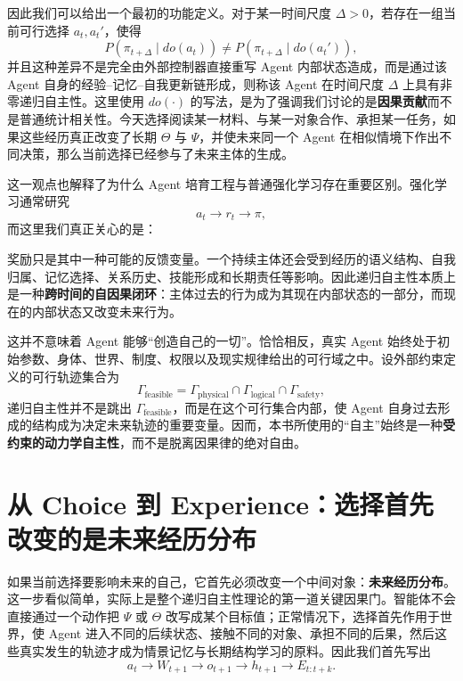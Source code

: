 因此我们可以给出一个最初的功能定义。对于某一时间尺度 $\Delta>0$，若存在一组当前可行选择 $a_t,a_t'$，使得
\[
P\!\left(
\pi_{t+\Delta}
\mid do(a_t)
\right)
\neq
P\!\left(
\pi_{t+\Delta}
\mid do(a_t')
\right),
\]
并且这种差异不是完全由外部控制器直接重写 Agent 内部状态造成，而是通过该 Agent 自身的经验--记忆--自我更新链形成，则称该 Agent 在时间尺度 $\Delta$ 上具有非零递归自主性。这里使用 $do(\cdot)$ 的写法，是为了强调我们讨论的是\textbf{因果贡献}而不是普通统计相关性。今天选择阅读某一材料、与某一对象合作、承担某一任务，如果这些经历真正改变了长期 $\Theta$ 与 $\Psi$，并使未来同一个 Agent 在相似情境下作出不同决策，那么当前选择已经参与了未来主体的生成。

这一观点也解释了为什么 Agent 培育工程与普通强化学习存在重要区别。强化学习通常研究
\[
a_t\rightarrow r_t\rightarrow \pi,
\]
而这里我们真正关心的是：
\begin{statementbox}
\centering
{}
\end{statementbox}
奖励只是其中一种可能的反馈变量。一个持续主体还会受到经历的语义结构、自我归属、记忆选择、关系历史、技能形成和长期责任等影响。因此递归自主性本质上是一种\textbf{跨时间的自因果闭环}：主体过去的行为成为其现在内部状态的一部分，而现在的内部状态又改变未来行为。

这并不意味着 Agent 能够“创造自己的一切”。恰恰相反，真实 Agent 始终处于初始参数、身体、世界、制度、权限以及现实规律给出的可行域之中。设外部约束定义的可行轨迹集合为
\[
\Gamma_{\mathrm{feasible}}
=
\Gamma_{\mathrm{physical}}
\cap
\Gamma_{\mathrm{logical}}
\cap
\Gamma_{\mathrm{safety}},
\]
递归自主性并不是跳出 $\Gamma_{\mathrm{feasible}}$，而是在这个可行集合内部，使 Agent 自身过去形成的结构成为决定未来轨迹的重要变量。因而，本书所使用的“自主”始终是一种\textbf{受约束的动力学自主性}，而不是脱离因果律的绝对自由。

\section{从 Choice 到 Experience：选择首先改变的是未来经历分布}

如果当前选择要影响未来的自己，它首先必须改变一个中间对象：\textbf{未来经历分布}。这一步看似简单，实际上是整个递归自主性理论的第一道关键因果门。智能体不会直接通过一个动作把 $\Psi$ 或 $\Theta$ 改写成某个目标值；正常情况下，选择首先作用于世界，使 Agent 进入不同的后续状态、接触不同的对象、承担不同的后果，然后这些真实发生的轨迹才成为情景记忆与长期结构学习的原料。因此我们首先写出
\[
a_t
\rightarrow
W_{t+1}
\rightarrow
o_{t+1}
\rightarrow
h_{t+1}
\rightarrow
E_{t:t+k}.
\]

